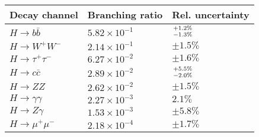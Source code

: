 \begin{table}
\centering
\scriptsize
\begin{tabular}{|l|l|l|}
    \hline
    Decay channel & Branching ratio & Rel. uncertainty  \\
    \hline
    $ H \to b \bar{b}        $    & $5.82 \times 10^{-1} $    & $ +1.2\% \atop -1.3\% $ \\
    $ H \to W^+ W^-          $    & $2.14 \times 10^{-1} $    & $\pm 1.5\%        $   \\
    $ H \to \tau^+ \tau^-    $    & $6.27 \times 10^{-2} $    & $\pm 1.6\%        $   \\
    $ H \to c \bar{c}        $    & $2.89 \times 10^{-2} $    & $ +5.5\% \atop -2.0\% $ \\
    $ H \to ZZ               $    & $2.62 \times 10^{-2} $    & $\pm 1.5\%        $   \\
    $ H \to \gamma \gamma    $    & $2.27 \times 10^{-3} $    & $    2.1\%        $   \\
    $ H \to Z \gamma         $    & $1.53 \times 10^{-3} $    & $\pm 5.8\%        $  \\
    $ H \to \mu^+ \mu^-      $    & $2.18 \times 10^{-4} $    & $\pm 1.7\%        $  \\
    \hline
\end{tabular}
\end{table}
